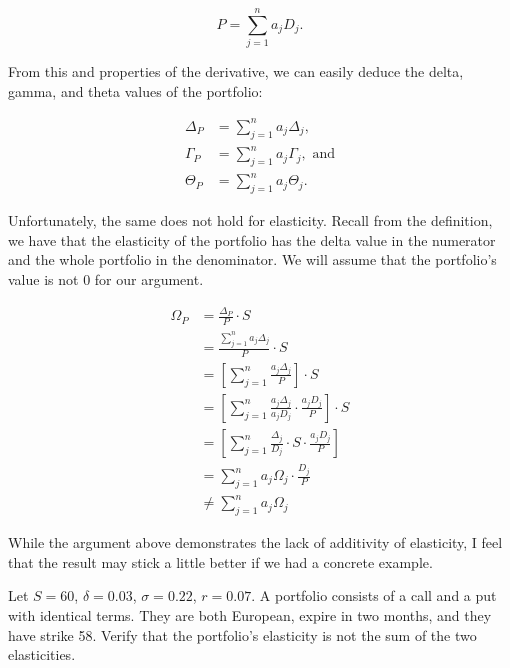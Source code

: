 \documentclass{ximera}
\begin{document}
\begin{equation*}
P=\sum_{j=1}^na_jD_j.
\end{equation*}

From this and properties of the derivative, we can easily deduce the delta, gamma, and theta values of the portfolio:

\begin{align*}
\Delta_P 	&=\sum_{j=1}^n a_j\Delta_j,\\
\Gamma_P 	&=\sum_{j=1}^n a_j\Gamma_j,\text{ and}\\
\Theta_P 	&=\sum_{j=1}^n a_j\Theta_j.
\end{align*}

Unfortunately, the same does not hold for elasticity. Recall from the definition, we have that the elasticity of the portfolio has the delta value in the numerator and the whole portfolio in the denominator. We will assume that the portfolio's value is not $0$ for our argument.

\begin{align*}
\Omega_P 		&=\frac{\Delta_P}{P}\cdot S\\
			&=\frac{\sum_{j=1}^n a_j \Delta_j}{P}\cdot S\\
			&=\left[\sum_{j=1}^n\frac{a_j \Delta_j}{P}\right]\cdot S\\
			&=\left[\sum_{j=1}^n\frac{a_j \Delta_j}{a_j D_j}\cdot\frac{a_j D_j}{P}\right]\cdot S\\
			&=\left[\sum_{j=1}^n \frac{\Delta_j}{D_j}\cdot S\cdot\frac{a_j D_j}{P}\right]\\
			&=\sum_{j=1}^n a_j\Omega_j\cdot \frac{D_j}{P}\\
			&\not=\sum_{j=1}^n a_j\Omega_j
\end{align*}

While the argument above demonstrates the lack of additivity of elasticity, I feel that the result may stick a little better if we had a concrete example.

\begin{example}
Let $S=60$, $\delta=0.03$, $\sigma=0.22$, $r=0.07$. A portfolio consists of a call and a put with identical terms. They are both European, expire in two months, and they have strike 58. Verify that the portfolio's elasticity is not the sum of the two elasticities.
\end{example}
\end{document}
